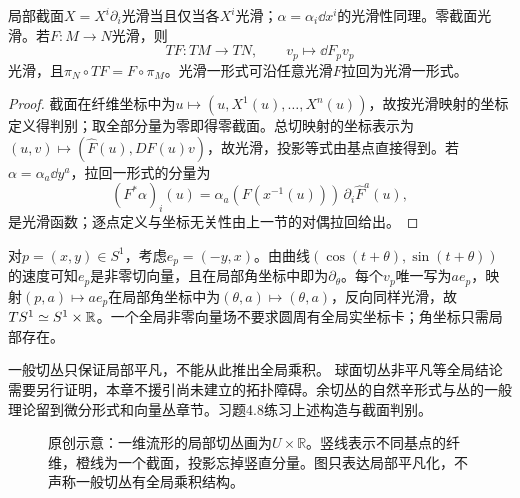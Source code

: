 \begin{corollary}[截面的坐标判别与总切映射]\label{cor:tangent-sections}
局部截面$X=X^i\partial_i$光滑当且仅当各$X^i$光滑；$\alpha=\alpha_i\dd x^i$的光滑性同理。零截面光滑。若$F:M\to N$光滑，则
\[
 TF:TM\to TN,\qquad v_p\mapsto\dd F_pv_p
\]
光滑，且$\pi_N\circ TF=F\circ\pi_M$。光滑一形式可沿任意光滑$F$拉回为光滑一形式。
\end{corollary}
\begin{proof}
截面在纤维坐标中为$u\mapsto(u,X^1(u),\ldots,X^n(u))$，故按光滑映射的坐标定义得判别；取全部分量为零即得零截面。总切映射的坐标表示为$(u,v)\mapsto(\widehat F(u),D\widehat F(u)v)$，故光滑，投影等式由基点直接得到。若$\alpha=\alpha_a\dd y^a$，拉回一形式的分量为
\[
 (F^*\alpha)_i(u)=\alpha_a(F(x^{-1}(u)))\,\partial_i\widehat F^a(u),
\]
是光滑函数；逐点定义与坐标无关性由上一节的对偶拉回给出。
\end{proof}
\begin{example}[圆周切丛的全局平凡化]
对$p=(x,y)\in S^1$，考虑$e_p=(-y,x)$。由曲线$(\cos(t+\theta),\sin(t+\theta))$的速度可知$e_p$是非零切向量，且在局部角坐标中即为$\partial_\theta$。每个$v_p$唯一写为$a e_p$，映射$(p,a)\mapsto a e_p$在局部角坐标中为$(\theta,a)\mapsto(\theta,a)$，反向同样光滑，故$TS^1\simeq S^1\times\mathbb{R}$。一个全局非零向量场不要求圆周有全局实坐标卡；角坐标只需局部存在。
\end{example}
一般切丛只保证局部平凡，不能从此推出全局乘积。
球面切丛非平凡等全局结论需要另行证明，本章不援引尚未建立的拓扑障碍。余切丛的自然辛形式与丛的一般理论留到微分形式和向量丛章节。习题4.8练习上述构造与截面判别。
\begin{figure}[htbp]
\centering

\caption{原创示意：一维流形的局部切丛画为$U\times\mathbb R$。竖线表示不同基点的纤维，橙线为一个截面，投影忘掉竖直分量。图只表达局部平凡化，不声称一般切丛有全局乘积结构。}
\label{fig:bundle-trivialization}
\end{figure}
